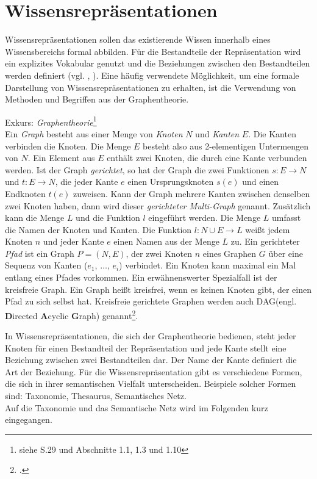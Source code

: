 \section{Wissensrepräsentationen}
\label{Ch:Vorbetrachtung:Sec:Wissensrepräsentaionen}
Wissensrepräsentationen sollen das existierende Wissen innerhalb eines Wissensbereichs formal abbilden. Für die Bestandteile der Repräsentation wird ein explizites Vokabular genutzt und die Beziehungen zwischen den Bestandteilen werden definiert (vgl. \cite[S. 60]{BEN16}, \cite[S. 1]{SEB04}). Eine häufig verwendete Möglichkeit, um eine formale Darstellung von Wissensrepräsentationen zu erhalten, ist die Verwendung von Methoden und Begriffen aus der Graphentheorie.

Exkurs: \textit{Graphentheorie}\footnote{siehe \cite{STU09} S.29 und \cite{DIE20} Abschnitte 1.1, 1.3 und 1.10}\\
Ein \textit{Graph} besteht aus einer Menge von \textit{Knoten} $N$ und \textit{Kanten} $E$. Die Kanten verbinden die Knoten. Die Menge $E$ besteht also aus 2-elementigen Untermengen von $N$. Ein Element aus $E$ enthält zwei Knoten, die durch eine Kante verbunden werden. Ist der Graph \textit{gerichtet}, so hat der Graph die zwei Funktionen $s:E\rightarrow N$ und $t:E\rightarrow N$, die jeder Kante $e$ einen Ursprungsknoten $s(e)$ und einen Endknoten $t(e)$ zuweisen. Kann der Graph mehrere Kanten zwischen denselben zwei Knoten haben, dann wird dieser \textit{gerichteter Multi-Graph} genannt. Zusätzlich kann die Menge $L$ und die Funktion $l$ eingeführt werden. Die Menge $L$ umfasst die Namen der Knoten und Kanten. Die Funktion $l:N\cup E\rightarrow L$ weißt jedem Knoten $n$ und jeder Kante $e$ einen Namen aus der Menge $L$ zu.
Ein gerichteter \textit{Pfad} ist ein Graph $P = (N, E)$, der zwei Knoten $n$ eines Graphen $G$ über eine Sequenz von Kanten ($e_1$, $\dots$, $e_i$) verbindet. Ein Knoten kann maximal ein Mal entlang eines Pfades vorkommen. 
Ein erwähnenswerter Spezialfall ist der kreisfreie Graph. \glqq Ein Graph heißt kreisfrei, wenn es keinen Knoten gibt, der einen Pfad zu sich selbst hat. Kreisfreie gerichtete Graphen werden auch DAG(engl. \textbf{D}irected \textbf{A}cyclic \textbf{G}raph) genannt\grqq\footcite{STU09}. 

In Wissensrepräsentationen, die sich der Graphentheorie bedienen, steht jeder Knoten für einen Bestandteil der Repräsentation und jede Kante stellt eine Beziehung zwischen zwei Bestandteilen dar. Der Name der Kante definiert die Art der Beziehung. Für die Wissensrepräsentation gibt es verschiedene Formen, die sich in ihrer semantischen Vielfalt unterscheiden. Beispiele solcher Formen sind: Taxonomie, Thesaurus, Semantisches Netz.\\ %
Auf die Taxonomie und das Semantische Netz wird im Folgenden kurz eingegangen.
 

